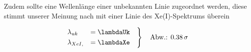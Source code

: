   Zudem sollte eine Wellenlänge einer unbekannten Linie zugeordnet werden, diese stimmt unserer Meinung nach mit einer Linie des Xe(I)-Spektrums überein

  \begin{align*}
    \begin{rcases}
      \lambda_{uk} &= \lambdaUk\quad\\
      \lambda_{Xe I, } &= \lambdaXe
    \end{rcases}
    \quad\text{Abw.: }\SI{.38}{\sigma}
  \end{align*}
